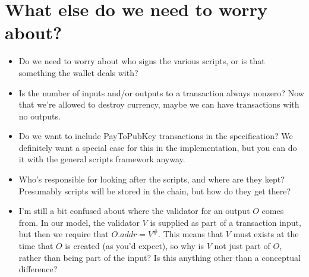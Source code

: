 \documentclass[a4paper]{article}
\newcommand{\blue}[1]{\textcolor{blue}{#1}}
\newcommand{\s}{\textsf}  %
\theoremstyle{definition}  %
\newcommand{\mi}[1]{\ensuremath{\mathit{#1}}}
\newcommand{\addr}{\mi{addr}}
\begin{document}
\section{What else do we need to worry about?}
\begin{itemize}
\item Do we need to worry about who signs the various scripts, or is that
  something the wallet deals with?
\item Is the number of inputs and/or outputs to a transaction always nonzero?
  Now that we're allowed to destroy currency, maybe we can have transactions
  with no outputs.
\item Do we want to include \s{PayToPubKey} transactions in the specification?
  We definitely want a special case for this in the implementation, but you
  can do it with the general scripts framework anyway.
\item Who's responsible for looking after the scripts, and where are they kept?
  Presumably scripts will be stored in the chain, but how do they get there?
\item I'm still a bit confused about where the validator for an output
  $O$ comes from.  In our model, the validator $V$ is supplied as part
  of a transaction input, but then we require that $O.\addr = V^\#$.
  This means that $V$ must exists at the time that $O$ is created (as
  you'd expect), so why is $V$ not just part of $O$, rather than being
  part of the input?  Is this anything other than a conceptual
  difference?
  
\end{itemize}





\end{document}
